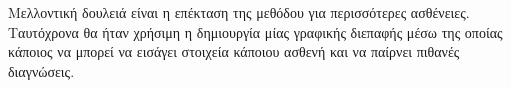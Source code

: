 \documentclass[10pt,leqno]{amsart}
\begin{document}
Μελλοντική δουλειά είναι η επέκταση της μεθόδου για περισσότερες ασθένειες.
Ταυτόχρονα θα ήταν χρήσιμη η δημιουργία μίας γραφικής διεπαφής μέσω 
της οποίας κάποιος να μπορεί να εισάγει στοιχεία κάποιου ασθενή και να παίρνει 
πιθανές διαγνώσεις.

\newpage


\end{document}
